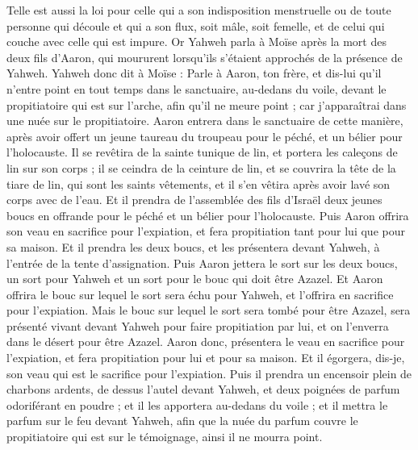 \begin{multicols}{2}
Telle est aussi la loi pour celle qui a son indisposition menstruelle ou de toute personne qui découle et qui a son flux, soit mâle, soit femelle, et de celui qui couche avec celle qui est impure.
\VerseOne{}Or Yahweh parla à Moïse après la mort des deux fils d'Aaron, qui moururent lorsqu'ils s'étaient approchés de la présence de Yahweh.
Yahweh donc dit à Moïse : Parle à Aaron, ton frère, et dis-lui qu'il n'entre point en tout temps dans le sanctuaire, au-dedans du voile, devant le propitiatoire qui est sur l'arche, afin qu'il ne meure point ; car j'apparaîtrai dans une nuée sur le propitiatoire.
Aaron entrera dans le sanctuaire de cette manière, après avoir offert un jeune taureau du troupeau pour le péché, et un bélier pour l'holocauste.
Il se revêtira de la sainte tunique de lin, et portera les caleçons de lin sur son corps ; il se ceindra de la ceinture de lin, et se couvrira la tête de la tiare de lin, qui sont les saints vêtements, et il s'en vêtira après avoir lavé son corps avec de l'eau.
Et il prendra de l'assemblée des fils d'Israël deux jeunes boucs en offrande pour le péché et un bélier pour l'holocauste.
Puis Aaron offrira son veau en sacrifice pour l'expiation, et fera propitiation tant pour lui que pour sa maison.
Et il prendra les deux boucs, et les présentera devant Yahweh, à l'entrée de la tente d'assignation.
Puis Aaron jettera le sort sur les deux boucs, un sort pour Yahweh et un sort pour le bouc qui doit être Azazel.
Et Aaron offrira le bouc sur lequel le sort sera échu pour Yahweh, et l'offrira en sacrifice pour l'expiation.
Mais le bouc sur lequel le sort sera tombé pour être Azazel, sera présenté vivant devant Yahweh pour faire propitiation par lui, et on l'enverra dans le désert pour être Azazel.
Aaron donc, présentera le veau en sacrifice pour l'expiation, et fera propitiation pour lui et pour sa maison. Et il égorgera, dis-je, son veau qui est le sacrifice pour l'expiation.
Puis il prendra un encensoir plein de charbons ardents, de dessus l'autel devant Yahweh, et deux poignées de parfum odoriférant en poudre ; et il les apportera au-dedans du voile ;
et il mettra le parfum sur le feu devant Yahweh, afin que la nuée du parfum couvre le propitiatoire qui est sur le témoignage, ainsi il ne mourra point.

\end{multicols}

